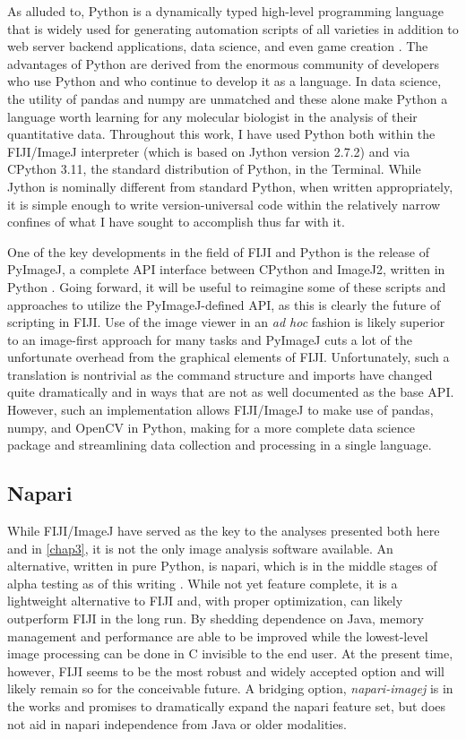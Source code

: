 As alluded to, Python is a dynamically typed high-level programming language that is widely used for generating automation scripts of all varieties in addition to web server backend applications, data science, and even game creation \citep{vanRossum1995}. The advantages of Python are derived from the enormous community of developers who use Python and who continue to develop it as a language. In data science, the utility of pandas and numpy are unmatched and these alone make Python a language worth learning for any molecular biologist in the analysis of their quantitative data. Throughout this work, I have used Python both within the FIJI/ImageJ interpreter (which is based on Jython version 2.7.2) and via CPython 3.11, the standard distribution of Python, in the Terminal. While Jython is nominally different from standard Python, when written appropriately, it is simple enough to write version-universal code within the relatively narrow confines of what I have sought to accomplish thus far with it.

One of the key developments in the field of FIJI and Python is the release of PyImageJ, a complete API interface between CPython and ImageJ2, written in Python \citep{Rueden2022}. Going forward, it will be useful to reimagine some of these scripts and approaches to utilize the PyImageJ-defined API, as this is clearly the future of scripting in FIJI. Use of the image viewer in an \textit{ad hoc} fashion is likely superior to an image-first approach for many tasks and PyImageJ cuts a lot of the unfortunate overhead from the graphical elements of FIJI. Unfortunately, such a translation is nontrivial as the command structure and imports have changed quite dramatically and in ways that are not as well documented as the base API. However, such an implementation allows FIJI/ImageJ to make use of pandas, numpy, and OpenCV in Python, making for a more complete data science package and streamlining data collection and processing in a single language. 

\subsection{Napari}

While FIJI/ImageJ have served as the key to the analyses presented both here and in \autoref{chap3}, it is not the only image analysis software available. An alternative, written in pure Python, is napari, which is in the middle stages of alpha testing as of this writing \citep{napari}. While not yet feature complete, it is a lightweight alternative to FIJI and, with proper optimization, can likely outperform FIJI in the long run. By shedding dependence on Java, memory management and performance are able to be improved while the lowest-level image processing can be done in C invisible to the end user. At the present time, however, FIJI seems to be the most robust and widely accepted option and will likely remain so for the conceivable future. A bridging option, \textit{napari\hyp{}imagej} is in the works and promises to dramatically expand the napari feature set, but does not aid in napari independence from Java or older modalities.

